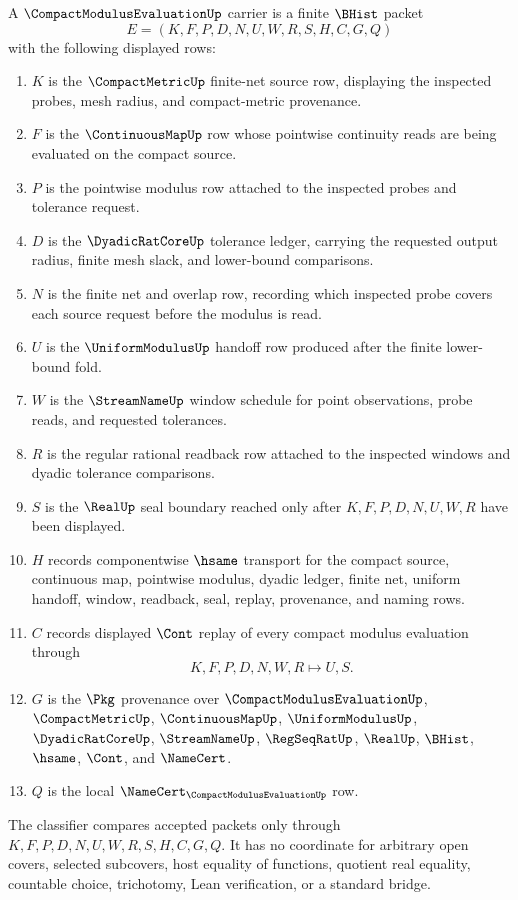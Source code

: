 \begin{definition}
\label{def:compact-modulus-evaluation-carrier}
A $\CompactModulusEvaluationUp$ carrier is a finite $\BHist$ packet
$$
E=(K,F,P,D,N,U,W,R,S,H,C,G,Q)
$$
with the following displayed rows:
\begin{enumerate}
\item $K$ is the $\CompactMetricUp$ finite-net source row, displaying the inspected probes, mesh radius, and compact-metric provenance.
\item $F$ is the $\ContinuousMapUp$ row whose pointwise continuity reads are being evaluated on the compact source.
\item $P$ is the pointwise modulus row attached to the inspected probes and tolerance request.
\item $D$ is the $\DyadicRatCoreUp$ tolerance ledger, carrying the requested output radius, finite mesh slack, and lower-bound comparisons.
\item $N$ is the finite net and overlap row, recording which inspected probe covers each source request before the modulus is read.
\item $U$ is the $\UniformModulusUp$ handoff row produced after the finite lower-bound fold.
\item $W$ is the $\StreamNameUp$ window schedule for point observations, probe reads, and requested tolerances.
\item $R$ is the regular rational readback row attached to the inspected windows and dyadic tolerance comparisons.
\item $S$ is the $\RealUp$ seal boundary reached only after $K,F,P,D,N,U,W,R$ have been displayed.
\item $H$ records componentwise $\hsame$ transport for the compact source, continuous map, pointwise modulus, dyadic ledger, finite net, uniform handoff, window, readback, seal, replay, provenance, and naming rows.
\item $C$ records displayed $\Cont$ replay of every compact modulus evaluation through
$$
K,F,P,D,N,W,R \longmapsto U,S .
$$
\item $G$ is the $\Pkg$ provenance over $\CompactModulusEvaluationUp$, $\CompactMetricUp$, $\ContinuousMapUp$, $\UniformModulusUp$, $\DyadicRatCoreUp$, $\StreamNameUp$, $\RegSeqRatUp$, $\RealUp$, $\BHist$, $\hsame$, $\Cont$, and $\NameCert$.
\item $Q$ is the local $\NameCert_{\CompactModulusEvaluationUp}$ row.
\end{enumerate}
The classifier compares accepted packets only through $K,F,P,D,N,U,W,R,S,H,C,G,Q$. It has no coordinate for arbitrary open covers, selected subcovers, host equality of functions, quotient real equality, countable choice, trichotomy, Lean verification, or a standard bridge.
\end{definition}

